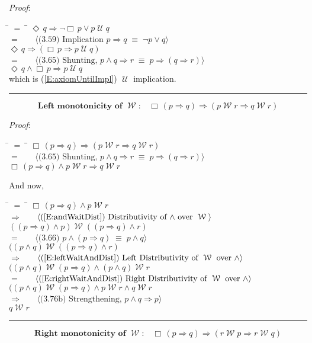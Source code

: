 \documentclass[12pt, fleqn, leqno]{article}
\newcommand{\lgap}{2pt}                             %
\newcommand{\mymathindent}{24pt}                    %
\newcommand{\equivs}{\ensuremath{\;\equiv\;}}       %
\newcommand{\impl}{\ensuremath{\Rightarrow}}        %
\newcommand{\Until}{\;\mathcal{U}\;}
\newcommand{\Wait}{\;\mathcal{W}\;}
\newcommand{\Event}{\Diamond\,}
\newcommand{\Always}{\Box\,}
\newcommand{\myqed}{\rule[-.23ex]{1.2ex}{2.0ex}}
\newcommand{\myqedtab}{\hspace{384pt}}              %
\newcommand{\Gll} {\langle}                         %
\newcommand{\Ggg} {\rangle}                         %
\newcommand{\Hint}[1]     {\ \ \ $\Gll              \mbox{#1} \Ggg$ }   %
\begin{document}
\emph{Proof}:
\begin{tabbing}
\hspace{\mymathindent} \= $= \;$ \= \myqedtab \= \kill
\> \> $\Event q\impl \neg\Always p\lor p \Until q$\\[\lgap]
\> $=$  \>  \Hint{(3.59) Implication $p\impl q \equivs \neg p \lor q$}\\[\lgap]
\> \> $\Event q\impl (\Always p\impl p \Until q)$\\[\lgap]
\> $=$  \>  \Hint{(3.65) Shunting, $p\land q \impl r \equivs p \impl (q \impl r)$}\\[\lgap]
\> \> $\Event q\land \Always p\impl p \Until q$\\[\lgap]
\> which is (\ref{E:axiomUntilImpl}) $\Until$ implication. \quad \myqed
\end{tabbing}
\begin{equation}\label{E:leftMonoWait}
\textbf{Left monotonicity of $\Wait$:}\quad \Always (p \impl q) \impl (p \Wait r \impl q \Wait r)
\end{equation}

\emph{Proof}:
\begin{tabbing}
\hspace{\mymathindent} \= $= \;$ \= \myqedtab \= \kill
  \> \>   $\Always (p \impl q) \impl (p \Wait r \impl q \Wait r)$\\[\lgap]
  \> $=$  \>  \Hint{(3.65) Shunting, $p\land q \impl r \equivs p \impl (q \impl r)$}\\[\lgap]
  \> \>   $\Always (p \impl q) \land p \Wait r \impl q \Wait r$
\end{tabbing}
And now,
\begin{tabbing}
\hspace{\mymathindent} \= $= \;$ \= \myqedtab \= \kill
  \> \>   $\Always (p \impl q) \land p \Wait r$\\[\lgap]
  \> $\impl$  \>  \Hint{(\ref{E:andWaitDist}) Distributivity of $\land$ over $\Wait$}\\[\lgap]
  \> \>   $((p \impl q) \land p) \Wait ((p \impl q) \land r)$\\[\lgap]
  \> $=$  \>  \Hint{(3.66) $p\land (p \impl q) \equivs  p \land q$}\\[\lgap]
  \> \>   $((p \land q) \Wait ((p \impl q) \land r)$\\[\lgap]
  \> $\impl$  \>  \Hint{(\ref{E:leftWaitAndDist}) Left Distributivity of $\Wait$ over $\land$}\\[\lgap]
  \> \>   $((p \land q) \Wait (p \impl q) \land (p \land q) \Wait r$\\[\lgap]
  \> $=$  \>  \Hint{(\ref{E:rightWaitAndDist}) Right Distributivity of $\Wait$ over $\land$}\\[\lgap]
  \> \>   $((p \land q) \Wait (p \impl q) \land p \Wait r \land q \Wait r$\\[\lgap]
  \> $\impl$ \> \Hint{(3.76b) Strengthening, $p\land q \impl p$} \\[\lgap]
  \> \>   $q \Wait r$ \quad \myqed
\end{tabbing}
\begin{equation}\label{E:rightMonoWait}
\textbf{Right monotonicity of $\Wait$:}\quad \Always (p \impl q) \impl (r \Wait p \impl r \Wait q)
\end{equation}
\end{document}
